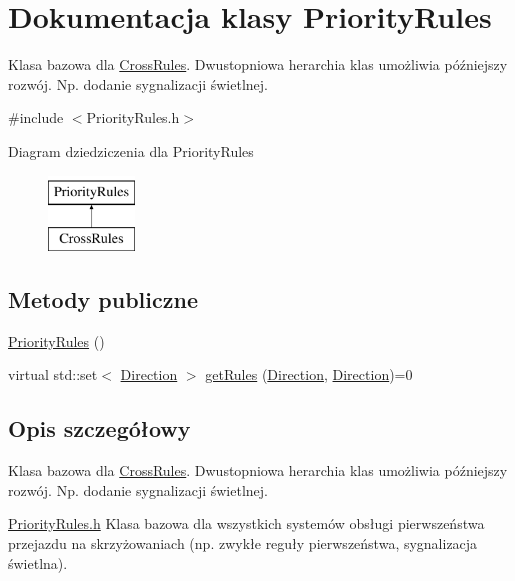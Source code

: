\hypertarget{class_priority_rules}{\section{Dokumentacja klasy Priority\-Rules}
\label{class_priority_rules}
}


Klasa bazowa dla \hyperlink{class_cross_rules}{Cross\-Rules}. Dwustopniowa herarchia klas umożliwia późniejszy rozwój. Np. dodanie sygnalizacji świetlnej.  




{\ttfamily \#include $<$Priority\-Rules.\-h$>$}

Diagram dziedziczenia dla Priority\-Rules\begin{figure}[H]
\begin{center}
\leavevmode
\includegraphics[height=2.000000cm]{class_priority_rules}
\end{center}
\end{figure}
\subsection*{Metody publiczne}
\begin{DoxyCompactItemize}
\item 
\hyperlink{class_priority_rules_a24de628b797363cfed852a507bb36291}{Priority\-Rules} ()
\item 
virtual std\-::set$<$ \hyperlink{_direction_8h_a224b9163917ac32fc95a60d8c1eec3aa}{Direction} $>$ \hyperlink{class_priority_rules_a1a64b70868b8c50ebe6bbc01062da361}{get\-Rules} (\hyperlink{_direction_8h_a224b9163917ac32fc95a60d8c1eec3aa}{Direction}, \hyperlink{_direction_8h_a224b9163917ac32fc95a60d8c1eec3aa}{Direction})=0
\end{DoxyCompactItemize}


\subsection{Opis szczegółowy}
Klasa bazowa dla \hyperlink{class_cross_rules}{Cross\-Rules}. Dwustopniowa herarchia klas umożliwia późniejszy rozwój. Np. dodanie sygnalizacji świetlnej. 

\hyperlink{_priority_rules_8h}{Priority\-Rules.\-h} Klasa bazowa dla wszystkich systemów obsługi pierwszeństwa przejazdu na skrzyżowaniach (np. zwykłe reguły pierwszeństwa, sygnalizacja świetlna). 

